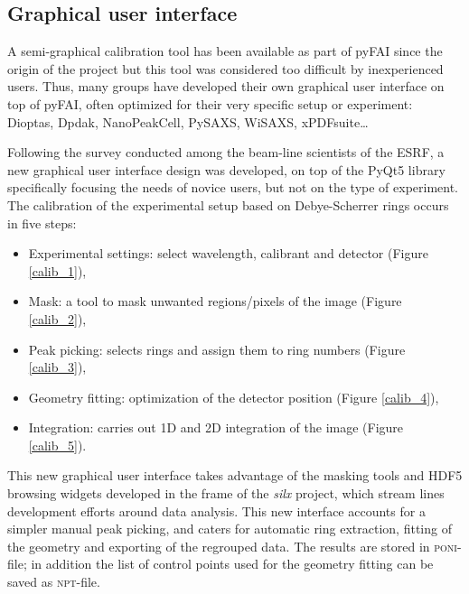 \documentclass[preprint]{iucr}              %
\begin{document}
\subsection{Graphical user interface}

A semi-graphical calibration tool has been available as part of pyFAI
\cite{fv5028} since the origin of the project but this tool was considered too
difficult by inexperienced users.
Thus, many groups have developed their own graphical user interface on top of
pyFAI, often optimized for their very specific setup or experiment:
Dioptas\cite{diopta_publi}, Dpdak\cite{dpdak}, NanoPeakCell\cite{nanopeakcell},
PySAXS\cite{pysaxs}, WiSAXS, xPDFsuite\cite{xpdfsuite}\ldots

Following the survey conducted among the beam-line scientists of the ESRF, a
new graphical user interface design was developed, on top of the PyQt5 library
\cite{pyqt} specifically focusing the needs of novice users, but not on the
type of experiment.
The calibration of the experimental setup based on Debye-Scherrer rings 
occurs in five steps:
\begin{itemize}
  \item Experimental settings: select wavelength, calibrant and detector (Figure
  \ref{calib_1}),
  \item Mask: a tool to mask unwanted regions/pixels of the
  image (Figure \ref{calib_2}),
  \item Peak picking: selects rings and assign them to ring numbers (Figure
  \ref{calib_3}),
  \item Geometry fitting: optimization of the detector position (Figure
  \ref{calib_4}), 
  \item Integration: carries out 1D and 2D integration of the image (Figure
  \ref{calib_5}). 
\end{itemize}

This new graphical user interface takes advantage of the masking tools and HDF5
browsing widgets developed in the frame of the \textit{silx} \cite{silx}
project, which stream lines development efforts around data analysis.
This new interface accounts for a simpler manual peak picking, and caters for
automatic ring extraction, fitting of the geometry and exporting of the
regrouped data.
The results are stored in \textsc{poni}-file; in
addition the list of control points used for the geometry fitting can be saved as \textsc{npt}-file.
\end{document}
